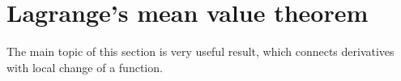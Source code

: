 \section{Lagrange's mean value theorem}
\noindent
The main topic of this section is very useful result, which connects derivatives with local change of a function.




